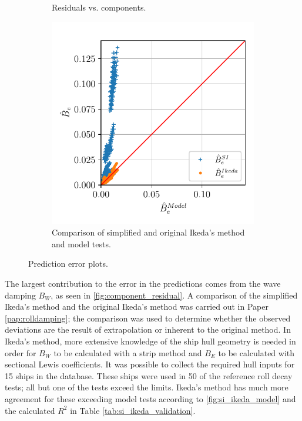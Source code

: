 \begin{figure}[h!]
\begin{subfigure}[b]{0.45\textwidth}
        \vspace{-0.2cm}
        \caption{Residuals vs. components.}
        \label{fig:component_residual}
        \vspace{0.3cm}
    \end{subfigure}
    \hfill
    \begin{subfigure}[b]{0.45\textwidth}
        \centering
        \includegraphics[width=\textwidth]{kappa/images/si_ikeda_model.pdf}
        \caption{Comparison of simplified and original Ikeda's method and model tests.}
        \label{fig:si_ikeda_model}
    \end{subfigure}

    \caption{Prediction error plots.}
\end{figure}

\noindent The largest contribution to the error in the predictions comes from the wave damping $B_W$, as seen in \autoref{fig:component_residual}. A comparison of the simplified Ikeda's method and the original Ikeda's method was carried out in Paper \ref{pap:rolldamping}; the comparison was used to determine whether the observed deviations are the result of extrapolation or inherent to the original method. In Ikeda's method, more extensive knowledge of the ship hull geometry is needed in order for $B_W$ to be calculated with a strip method and $B_E$ to be calculated with sectional Lewis coefficients. It was possible to collect the required hull inputs for 15 ships in the database. These ships were used in 50 of the reference roll decay tests; all but one of the tests exceed the limits. Ikeda's method has much more agreement for these exceeding model tests according to \autoref{fig:si_ikeda_model} and the calculated $R^2$ in Table \ref{tab:si_ikeda_validation}.

